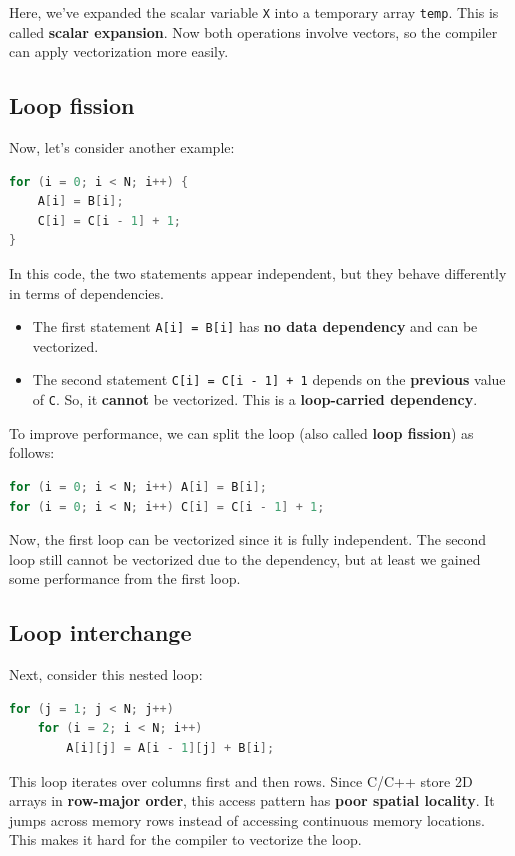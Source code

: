\documentclass[12pt]{book}
\begin{document}
Here, we’ve expanded the scalar variable \texttt{X} into a temporary array \texttt{temp}. This is called \textbf{scalar expansion}. Now both operations involve vectors, so the compiler can apply vectorization more easily.

\subsection{Loop fission}
Now, let’s consider another example:
\begin{lstlisting}[language=C++]
for (i = 0; i < N; i++) {
    A[i] = B[i];
    C[i] = C[i - 1] + 1;
}
\end{lstlisting}

In this code, the two statements appear independent, but they behave differently in terms of dependencies.

\begin{itemize}
    \item The first statement \texttt{A[i] = B[i]} has \textbf{no data dependency} and can be vectorized.
    \item The second statement \texttt{C[i] = C[i - 1] + 1} depends on the \textbf{previous} value of \texttt{C}. So, it \textbf{cannot} be vectorized. This is a \textbf{loop-carried dependency}.
\end{itemize}

To improve performance, we can split the loop (also called \textbf{loop fission}) as follows:

\begin{lstlisting}[language=C++]
for (i = 0; i < N; i++) A[i] = B[i];
for (i = 0; i < N; i++) C[i] = C[i - 1] + 1;
\end{lstlisting}

Now, the first loop can be vectorized since it is fully independent. The second loop still cannot be vectorized due to the dependency, but at least we gained some performance from the first loop.

\subsection{Loop interchange}
Next, consider this nested loop:
\begin{lstlisting}[language=C++]
for (j = 1; j < N; j++)
    for (i = 2; i < N; i++)
        A[i][j] = A[i - 1][j] + B[i];
\end{lstlisting}

This loop iterates over columns first and then rows. Since C/C++ store 2D arrays in \textbf{row-major order}, this access pattern has \textbf{poor spatial locality}. It jumps across memory rows instead of accessing continuous memory locations. This makes it hard for the compiler to vectorize the loop.
\end{document}
